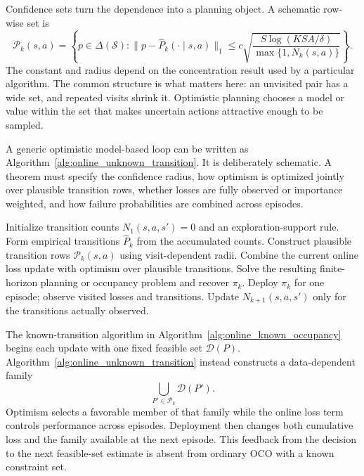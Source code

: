 Confidence sets turn the dependence into a planning object. A schematic row-wise set is
\begin{equation}
\mathcal P_k(s,a)
=
\left\{p\in\Delta(\mathcal S):
\lVert p-\widehat P_k(\cdot\mid s,a)\rVert_1
\leq c\sqrt{\frac{S\log(KSA/\delta)}{\max\{1,N_k(s,a)\}}}
\right\}.
\label{eq:online_transition_confidence_set}
\end{equation}
The constant and radius depend on the concentration result used by a particular algorithm. The common structure is what matters here: an unvisited pair has a wide set, and repeated visits shrink it. Optimistic planning chooses a model or value within the set that makes uncertain actions attractive enough to be sampled.

A generic optimistic model-based loop can be written as Algorithm~\ref{alg:online_unknown_transition}. It is deliberately schematic. A theorem must specify the confidence radius, how optimism is optimized jointly over plausible transition rows, whether losses are fully observed or importance weighted, and how failure probabilities are combined across episodes.

\begin{algorithm}[htbp]
\caption{Schematic occupancy-based learning with unknown transitions}
\label{alg:online_unknown_transition}
\begin{algorithmic}[1]
\State Initialize transition counts $N_1(s,a,s')=0$ and an exploration-support rule.
\State Form empirical transitions $\widehat P_k$ from the accumulated counts.
\State Construct plausible transition rows $\mathcal P_k(s,a)$ using visit-dependent radii.
\State Combine the current online loss update with optimism over plausible transitions.
\State Solve the resulting finite-horizon planning or occupancy problem and recover $\pi_k$.
\State Deploy $\pi_k$ for one episode; observe visited losses and transitions.
\State Update $N_{k+1}(s,a,s')$ only for the transitions actually observed.
\EndFor
\end{algorithmic}
\end{algorithm}

The known-transition algorithm in Algorithm~\ref{alg:online_known_occupancy} begins each update with one fixed feasible set $\mathcal D(P)$. Algorithm~\ref{alg:online_unknown_transition} instead constructs a data-dependent family
\[
\bigcup_{P'\in\mathcal P_k}\mathcal D(P').
\]
Optimism selects a favorable member of that family while the online loss term controls performance across episodes. Deployment then changes both cumulative loss and the family available at the next episode. This feedback from the decision to the next feasible-set estimate is absent from ordinary OCO with a known constraint set.

